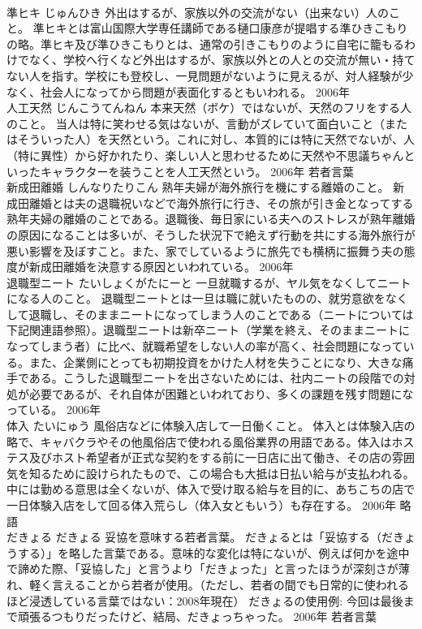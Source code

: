 \documentclass[8pt]{extreport}
\begin{document}
\begin{CJK}{UTF8}{min}
\\	準ヒキ	じゅんひき	外出はするが、家族以外の交流がない（出来ない）人のこと。	準ヒキとは富山国際大学専任講師である樋口康彦が提唱する準ひきこもりの略。準ヒキ及び準ひきこもりとは、通常の引きこもりのように自宅に籠もるわけでなく、学校へ行くなど外出はするが、家族以外との人との交流が無い・持てない人を指す。学校にも登校し、一見問題がないように見えるが、対人経験が少なく、社会人になってから問題が表面化するともいわれる。	2006年	
\\	人工天然	じんこうてんねん	本来天然（ボケ）ではないが、天然のフリをする人のこと。	当人は特に笑わせる気はないが、言動がズレていて面白いこと（またはそういった人）を天然という。これに対し、本質的には特に天然でないが、人（特に異性）から好かれたり、楽しい人と思わせるために天然や不思議ちゃんといったキャラクターを装うことを人工天然という。	2006年	若者言葉	
\\	新成田離婚	しんなりたりこん	熟年夫婦が海外旅行を機にする離婚のこと。	新成田離婚とは夫の退職祝いなどで海外旅行に行き、その旅が引き金となってする熟年夫婦の離婚のことである。退職後、毎日家にいる夫へのストレスが熟年離婚の原因になることは多いが、そうした状況下で絶えず行動を共にする海外旅行が悪い影響を及ぼすこと。また、家でしているように旅先でも横柄に振舞う夫の態度が新成田離婚を決意する原因といわれている。	2006年	
\\	退職型ニート	たいしょくがたにーと	一旦就職するが、ヤル気をなくしてニートになる人のこと。	退職型ニートとは一旦は職に就いたものの、就労意欲をなくして退職し、そのままニートになってしまう人のことである（ニートについては下記関連語参照）。退職型ニートは新卒ニート（学業を終え、そのままニートになってしまう者）に比べ、就職希望をしない人の率が高く、社会問題になっている。また、企業側にとっても初期投資をかけた人材を失うことになり、大きな痛手である。こうした退職型ニートを出さないためには、社内ニートの段階での対処が必要であるが、それ自体が困難といわれており、多くの課題を残す問題になっている。	2006年	
\\	体入	たいにゅう	風俗店などに体験入店して一日働くこと。	体入とは体験入店の略で、キャバクラやその他風俗店で使われる風俗業界の用語である。体入はホステス及びホスト希望者が正式な契約をする前に一日店に出て働き、その店の雰囲気を知るために設けられたもので、この場合も大抵は日払い給与が支払われる。中には勤める意思は全くないが、体入で受け取る給与を目的に、あちこちの店で一日体験入店をして回る体入荒らし（体入女ともいう）も存在する。	2006年	略語	
\\	だきょる	だきょる	妥協を意味する若者言葉。	だきょるとは「妥協する（だきょうする）」を略した言葉である。意味的な変化は特にないが、例えば何かを途中で諦めた際、「妥協した」と言うより「だきょった」と言ったほうが深刻さが薄れ、軽く言えることから若者が使用。（ただし、若者の間でも日常的に使われるほど浸透している言葉ではない：2008年現在） だきょるの使用例: 今回は最後まで頑張るつもりだったけど、結局、だきょっちゃった。	2006年	若者言葉	

\end{CJK}
\end{document}
